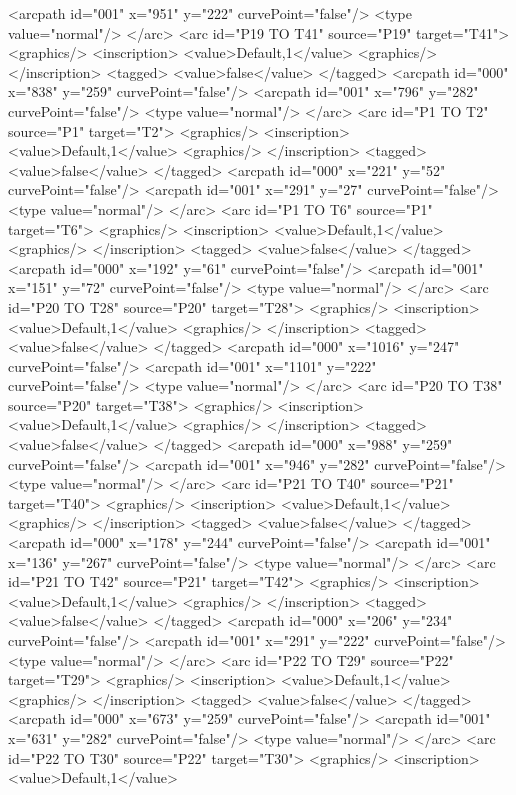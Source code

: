 <arcpath id="001" x="951" y="222" curvePoint="false"/>
<type value="normal"/>
</arc>
<arc id="P19 TO T41" source="P19" target="T41">
<graphics/>
<inscription>
<value>Default,1</value>
<graphics/>
</inscription>
<tagged>
<value>false</value>
</tagged>
<arcpath id="000" x="838" y="259" curvePoint="false"/>
<arcpath id="001" x="796" y="282" curvePoint="false"/>
<type value="normal"/>
</arc>
<arc id="P1 TO T2" source="P1" target="T2">
<graphics/>
<inscription>
<value>Default,1</value>
<graphics/>
</inscription>
<tagged>
<value>false</value>
</tagged>
<arcpath id="000" x="221" y="52" curvePoint="false"/>
<arcpath id="001" x="291" y="27" curvePoint="false"/>
<type value="normal"/>
</arc>
<arc id="P1 TO T6" source="P1" target="T6">
<graphics/>
<inscription>
<value>Default,1</value>
<graphics/>
</inscription>
<tagged>
<value>false</value>
</tagged>
<arcpath id="000" x="192" y="61" curvePoint="false"/>
<arcpath id="001" x="151" y="72" curvePoint="false"/>
<type value="normal"/>
</arc>
<arc id="P20 TO T28" source="P20" target="T28">
<graphics/>
<inscription>
<value>Default,1</value>
<graphics/>
</inscription>
<tagged>
<value>false</value>
</tagged>
<arcpath id="000" x="1016" y="247" curvePoint="false"/>
<arcpath id="001" x="1101" y="222" curvePoint="false"/>
<type value="normal"/>
</arc>
<arc id="P20 TO T38" source="P20" target="T38">
<graphics/>
<inscription>
<value>Default,1</value>
<graphics/>
</inscription>
<tagged>
<value>false</value>
</tagged>
<arcpath id="000" x="988" y="259" curvePoint="false"/>
<arcpath id="001" x="946" y="282" curvePoint="false"/>
<type value="normal"/>
</arc>
<arc id="P21 TO T40" source="P21" target="T40">
<graphics/>
<inscription>
<value>Default,1</value>
<graphics/>
</inscription>
<tagged>
<value>false</value>
</tagged>
<arcpath id="000" x="178" y="244" curvePoint="false"/>
<arcpath id="001" x="136" y="267" curvePoint="false"/>
<type value="normal"/>
</arc>
<arc id="P21 TO T42" source="P21" target="T42">
<graphics/>
<inscription>
<value>Default,1</value>
<graphics/>
</inscription>
<tagged>
<value>false</value>
</tagged>
<arcpath id="000" x="206" y="234" curvePoint="false"/>
<arcpath id="001" x="291" y="222" curvePoint="false"/>
<type value="normal"/>
</arc>
<arc id="P22 TO T29" source="P22" target="T29">
<graphics/>
<inscription>
<value>Default,1</value>
<graphics/>
</inscription>
<tagged>
<value>false</value>
</tagged>
<arcpath id="000" x="673" y="259" curvePoint="false"/>
<arcpath id="001" x="631" y="282" curvePoint="false"/>
<type value="normal"/>
</arc>
<arc id="P22 TO T30" source="P22" target="T30">
<graphics/>
<inscription>
<value>Default,1</value>
